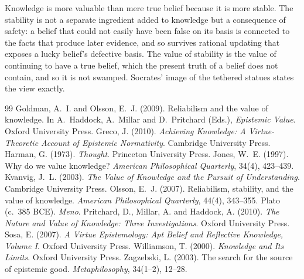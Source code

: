 \documentclass{situationist-preprint}
\begin{document}
Knowledge is more valuable than mere true belief because it is more stable. The stability is not a separate ingredient added to knowledge but a consequence of safety: a belief that could not easily have been false on its basis is connected to the facts that produce later evidence, and so survives rational updating that exposes a lucky belief's defective basis. The value of stability is the value of continuing to have a true belief, which the present truth of a belief does not contain, and so it is not swamped. Socrates' image of the tethered statues states the view exactly.

\begin{thebibliography}{99}\small
{} Goldman, A.~I. and Olsson, E.~J. (2009). Reliabilism and the value of knowledge. In A.~Haddock, A.~Millar and D.~Pritchard (Eds.), \emph{Epistemic Value}. Oxford University Press.
 Greco, J. (2010). \emph{Achieving Knowledge: A Virtue-Theoretic Account of Epistemic Normativity}. Cambridge University Press.
 Harman, G. (1973). \emph{Thought}. Princeton University Press.
 Jones, W.~E. (1997). Why do we value knowledge? \emph{American Philosophical Quarterly}, 34(4), 423--439.
 Kvanvig, J.~L. (2003). \emph{The Value of Knowledge and the Pursuit of Understanding}. Cambridge University Press.
 Olsson, E.~J. (2007). Reliabilism, stability, and the value of knowledge. \emph{American Philosophical Quarterly}, 44(4), 343--355.
 Plato (c.~385 BCE). \emph{Meno}.
 Pritchard, D., Millar, A. and Haddock, A. (2010). \emph{The Nature and Value of Knowledge: Three Investigations}. Oxford University Press.
 Sosa, E. (2007). \emph{A Virtue Epistemology: Apt Belief and Reflective Knowledge, Volume I}. Oxford University Press.
 Williamson, T. (2000). \emph{Knowledge and Its Limits}. Oxford University Press.
 Zagzebski, L. (2003). The search for the source of epistemic good. \emph{Metaphilosophy}, 34(1--2), 12--28.
\end{thebibliography}
\end{document}
